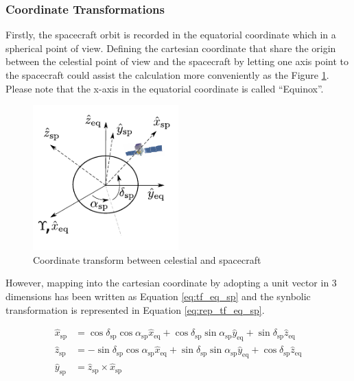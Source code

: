 \subsubsection{Coordinate Transformations}

Firstly, the spacecraft orbit is recorded in the equatorial coordinate
which in a spherical point of view. Defining the cartesian coordinate
that share the origin between the celestial point of view and the spacecraft 
by letting one axis point to the spacecraft could assist the calculation
more conveniently as the Figure \ref{fig:coord_eq_sp}. Please note that 
the x-axis in the equatorial coordinate is called ``Equinox''.

\begin{figure}[h!]
    \centering
    \includegraphics[width=0.5\textwidth]{content/methodology/figures/coord_eq_sp.pdf}
    \caption{Coordinate transform between celestial and spacecraft}
    \label{fig:coord_eq_sp}
\end{figure}


However, mapping into the cartesian 
coordinate by adopting a unit vector in 3 dimensions has been written
as Equation \ref{eq:tf_eq_sp} and the synbolic transformation is 
represented in Equation \ref{eq:rep_tf_eq_sp}.

\begin{equation}
    \begin{split}
    \hat{x}_\text{sp} &= \cos\delta_\text{sp}\cos\alpha_\text{sp}\hat{x}_\text{eq} + \cos\delta_\text{sp}\sin\alpha_\text{sp}\hat{y}_\text{eq} + \sin\delta_\text{sp}\hat{z}_\text{eq}\\
    \hat{z}_\text{sp} &= - \sin\delta_\text{sp}\cos\alpha_\text{sp}\hat{x}_\text{eq} + \sin\delta_\text{sp}\sin\alpha_\text{sp}\hat{y}_\text{eq} + \cos\delta_\text{sp}\hat{z}_\text{eq} \\
    \hat{y}_\text{sp} &= \hat{z}_\text{sp} \times \hat{x}_\text{sp}
    \end{split}
    \label{eq:tf_eq_sp}
\end{equation}

